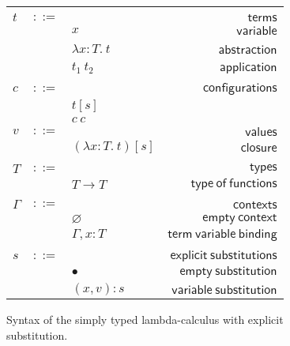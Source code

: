 \documentclass {article}
\newcommand{\app}[2]{#1 \ #2}
\newcommand{\abs}[3]{\lambda #1:#2. \ #3}
\newcommand{\conf}[2][s]{(#2)[#1]}
\begin{document}
\begin{figure}
\begin{small}
\begin{center}
\begin{tabular}{|l c l r|}
\hline
&&&\\
$t$&$::=$&&$\mathsf {terms}$\\
&&$x$&$\mathsf {variable}$\\
&&$\abs {x}{T}{t}$&\ $\mathsf {abstraction}$\\
&&$\app {t_1}{t_2}$&$\mathsf {application}$\\
&&&\\
$c$&$::=$&&$\mathsf {configurations}$\\
&&$t[s]$&\\
&&$c \ c $&\\
$v$&$::=$&&$\mathsf {values}$\\
&&$\conf {\abs {x}{T}{t}}$&$\mathsf {closure}$\\
&&&\\
$T$&$::=$&&$\mathsf {types}$\\
&&$T \to T$&$\mathsf {type \ of \ functions}$\\
&&&\\
$\Gamma$&$::=$&&$\mathsf {contexts}$\\
&&$\varnothing$&$\mathsf {empty \ context}$\\
&&$\Gamma , x:T$&$\mathsf {term \ variable \ binding}$\\
&&&\\
$s$&$::=$&&$\mathsf {explicit \ substitutions}$\\
&&$ \bullet$&$\mathsf {empty \ substitution}$\\
&&$(x,v):s$&$\mathsf {variable \ substitution}$\\
\hline
\end{tabular}
\caption{Syntax of the simply typed lambda-calculus with explicit substitution.}
\label{figure:sencilla}
\end{center}
\end{small}
\end{figure}
\end{document}
